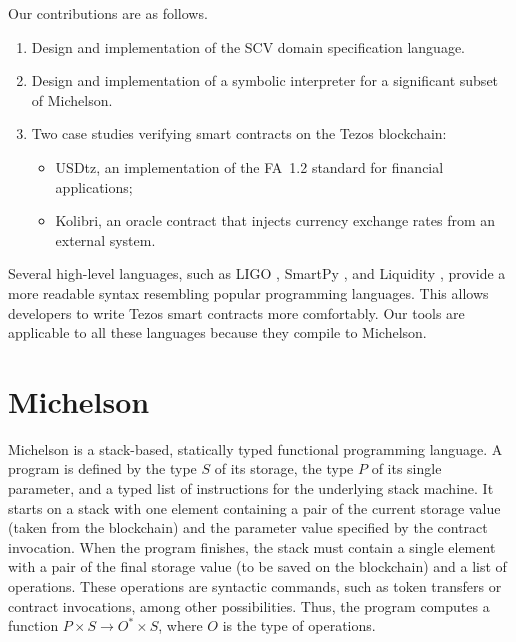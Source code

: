 \documentclass[runningheads]{llncs}
\begin{document}
Our contributions are as follows.
\begin{enumerate}
\item Design and implementation of the SCV domain specification language.
\item Design and implementation of a symbolic interpreter for a significant subset of Michelson. 
\item Two case studies verifying smart contracts on the Tezos blockchain:
  \begin{itemize}
  \item USDtz, an implementation of the FA~1.2 standard for financial applications;
  \item Kolibri, an oracle contract that injects currency exchange rates from an external system.
  \end{itemize}
\end{enumerate}

Several high-level languages, such as LIGO \cite{ligo}, SmartPy \cite{smartpy}, and Liquidity \cite{liquidity}, provide a more readable syntax resembling popular programming languages. This allows developers to write Tezos smart contracts more comfortably. Our tools are applicable to all these languages because they compile to Michelson.
\section{Michelson}
\label{sec:background}
Michelson is a stack-based, statically typed functional programming language. A program is defined by the type $S$ of its storage, the type $P$ of its single parameter, and a typed list of instructions for the underlying stack machine. It starts on a stack with one element containing a pair of the current storage value (taken from the blockchain) and the parameter value specified by the contract invocation. When the program finishes, the stack must contain a single element with a pair of the final storage value (to be saved on the blockchain) and a list of operations. These operations are syntactic commands, such as token transfers or contract invocations, among other possibilities. Thus, the program computes a function $P \times S \to O^* \times S$, where $O$ is the type of operations.
\end{document}
